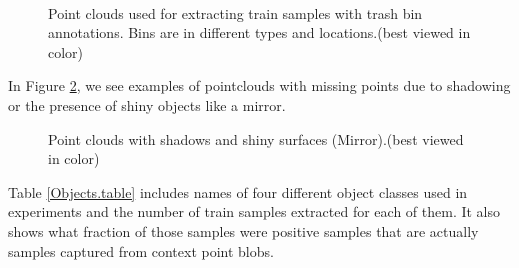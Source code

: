 \begin{figure} [htp]
     \begin{center}
    \\
    \end{center}
  \caption[Train set pointclouds]
  {Point clouds used for extracting train samples with trash bin annotations. Bins are in different types and locations.(best viewed in color)}
  \label{TrainClouds1.figure:edge}
\end{figure}

In Figure \ref{TrainClouds1Challenge.figure:edge}, we see examples of pointclouds with missing points due to shadowing or the presence of shiny objects like a mirror. 

\begin{figure} [htp]
    \begin{center}
   \end{center}
  \caption[Challenges with some pointclouds]
  {Point clouds with shadows and shiny surfaces (Mirror).(best viewed in color)}
  \label{TrainClouds1Challenge.figure:edge}
\end{figure}



Table \ref{Objects.table} includes names of four different object classes used in experiments and the number of train samples extracted for each of them.
It also shows what fraction of those samples were positive samples that are actually samples captured from context point blobs.


